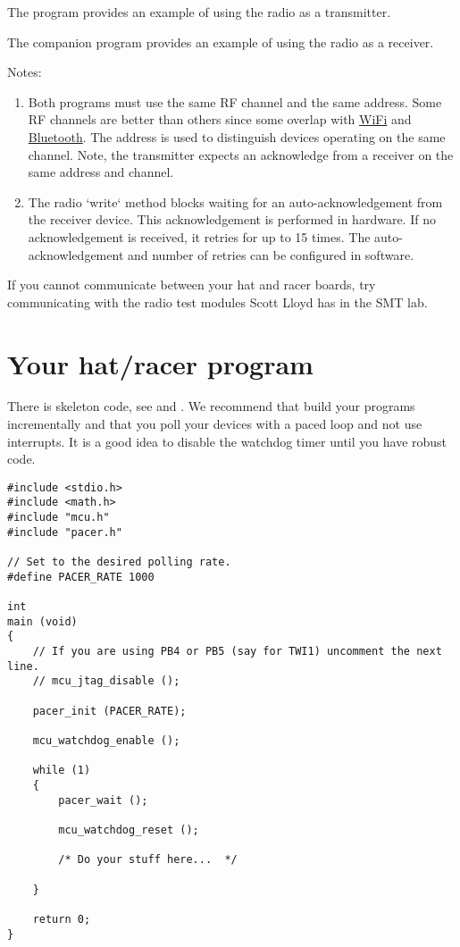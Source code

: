 The program
\href{https://eng-git.canterbury.ac.nz/mph/wacky-racers-2021/blob/master/src/demo-apps/radio_tx_test1/radio_tx_test1.c}{}
provides an example of using the radio as a transmitter.

The companion program
\href{https://eng-git.canterbury.ac.nz/mph/wacky-racers-2021/blob/master/src/demo-apps/radio_rx_test1/radio_rx_test1.c}{}
provides an example of using the radio as a receiver.

Notes:
%
\begin{enumerate}
\item
  Both programs must use the same RF channel and the same address. Some
  RF channels are better than others since some overlap with \url{WiFi}
  and \url{Bluetooth}. The address is used to distinguish devices
  operating on the same channel. Note, the transmitter expects an
  acknowledge from a receiver on the same address and channel.
\item
  The radio `write` method blocks waiting for an auto-acknowledgement
  from the receiver device. This acknowledgement is performed in
  hardware. If no acknowledgement is received, it retries for up to 15
  times. The auto-acknowledgement and number of retries can be
  configured in software.
\end{enumerate}

If you cannot communicate between your hat and racer boards, try
communicating with the radio test modules Scott Lloyd has in the SMT
lab.

\section{Your hat/racer program}
\label{your-hatracer-program}

There is skeleton code, see
 and
. We recommend that
build your programs incrementally and that you poll your devices with a
paced loop and not use interrupts. It is a good idea to disable the
watchdog timer until you have robust code.

\begin{verbatim}
#include <stdio.h>
#include <math.h>
#include "mcu.h"
#include "pacer.h"

// Set to the desired polling rate.
#define PACER_RATE 1000

int
main (void)
{
    // If you are using PB4 or PB5 (say for TWI1) uncomment the next line.
    // mcu_jtag_disable ();    

    pacer_init (PACER_RATE);    
    
    mcu_watchdog_enable ();

    while (1)
    {
        pacer_wait ();

        mcu_watchdog_reset ();

        /* Do your stuff here...  */
        
    }
    
    return 0;
}
\end{verbatim}

